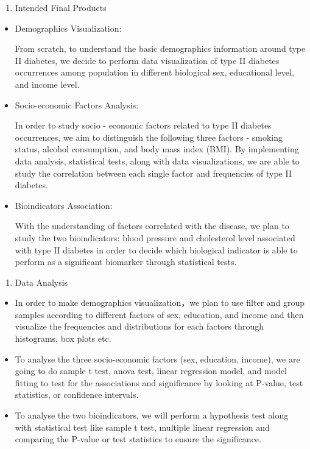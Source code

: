 \documentclass[
]{article}
\providecommand{\tightlist}{%
  \setlength{\itemsep}{0pt}\setlength{\parskip}{0pt}}
\begin{document}
\begin{enumerate}
\def\labelenumi{\arabic{enumi}.}
\setcounter{enumi}{3}
\tightlist
\item
  Intended Final Products
\end{enumerate}

\begin{itemize}
\item
  Demographics Visualization:

  From scratch, to understand the basic demographics information around
  type II diabetes, we decide to perform data visualization of type II
  diabetes occurrences among population in different biological sex,
  educational level, and income level.
\item
  Socio-economic Factors Analysis:

  In order to study socio - economic factors related to type II diabetes
  occurrences, we aim to distinguish the following three factors -
  smoking status, alcohol consumption, and body mass index (BMI). By
  implementing data analysis, statistical tests, along with data
  visualizations, we are able to study the correlation between each
  single factor and frequencies of type II diabetes.
\item
  Bioindicators Association:

  With the understanding of factors correlated with the disease, we plan
  to study the two bioindicators: blood pressure and cholesterol level
  associated with type II diabetes in order to decide which biological
  indicator is able to perform as a significant biomarker through
  statistical tests.
\end{itemize}

\begin{enumerate}
\def\labelenumi{\arabic{enumi}.}
\setcounter{enumi}{4}
\tightlist
\item
  Data Analysis
\end{enumerate}

\begin{itemize}
\item
  In order to make demographics visualization，we plan to use filter and
  group samples according to different factors of sex, education, and
  income and then visualize the frequencies and distributions for each
  factors through histograms, box plots etc.
\item
  To analyse the three socio-economic factors (sex, education, income),
  we are going to do sample t test, anova test, linear regression model,
  and model fitting to test for the associations and significance by
  looking at P-value, test statistics, or confidence intervals.
\item
  To analyse the two bioindicators, we will perform a hypothesis test
  along with statistical test like sample t test, multiple linear
  regression and comparing the P-value or test statistics to ensure the
  significance.
\end{itemize}
\end{document}
